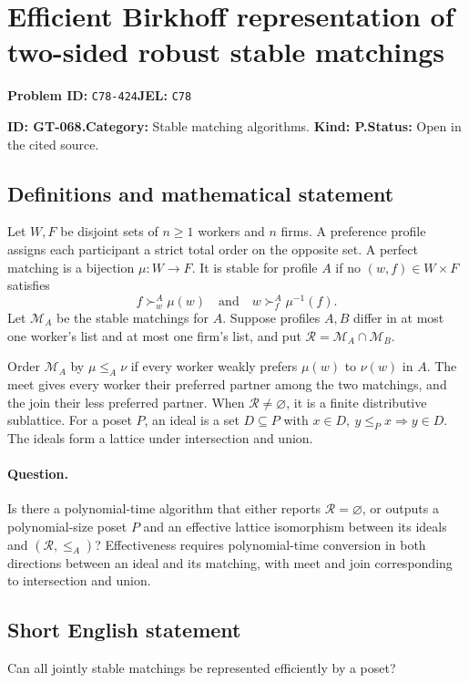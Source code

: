 \documentclass[11pt,a4paper]{article}
\begin{document}
\section*{Efficient Birkhoff representation of two-sided robust stable matchings}
\textbf{Problem ID:} \texttt{C78-424}\quad \textbf{JEL:} \texttt{C78}\par
\label{problem:OP-0198}
\label{game:GT-068}
{\sffamily\small\color{muted}
\noindent\textbf{ID: GT-068.}\quad\textbf{Category:} Stable matching algorithms.
\quad\textbf{Kind: P.}\quad\textbf{Status:} Open in the cited source.
\par}
\subsection*{Definitions and mathematical statement}
Let \(W,F\) be disjoint sets of \(n\geq1\) workers and \(n\) firms.
A preference profile assigns each participant a strict total order on
the opposite set. A perfect matching is a bijection \(\mu:W\to F\).
It is stable for profile \(A\) if no \((w,f)\in W\times F\) satisfies
\[
 f\succ^A_w\mu(w)
 \quad\text{and}\quad
 w\succ^A_f\mu^{-1}(f).
\]
Let \(\mathcal M_A\) be the stable matchings for \(A\).
Suppose profiles \(A,B\) differ in at most one worker's list and at most
one firm's list, and put \(\mathcal R=\mathcal M_A\cap\mathcal M_B\).

Order \(\mathcal M_A\) by \(\mu\leq_A\nu\) if every worker weakly
prefers \(\mu(w)\) to \(\nu(w)\) in \(A\). The meet gives every worker
their preferred partner among the two matchings, and the join their less
preferred partner. When \(\mathcal R\ne\varnothing\), it is a finite
distributive sublattice. For a poset \(P\), an ideal is a set
\(D\subseteq P\) with \(x\in D,\ y\leq_P x\Rightarrow y\in D\).
The ideals form a lattice under intersection and union.

\paragraph{Question.}
Is there a polynomial-time algorithm that either reports
\(\mathcal R=\varnothing\), or outputs a polynomial-size poset \(P\)
and an effective lattice isomorphism between its ideals and
\((\mathcal R,\leq_A)\)? Effectiveness requires polynomial-time
conversion in both directions between an ideal and its matching,
with meet and join corresponding to intersection and union.

\subsection*{Short English statement}
Can all jointly stable matchings be represented efficiently by a poset?
\end{document}
